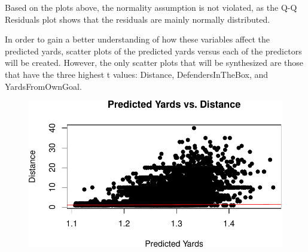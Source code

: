 \documentclass[
  super,
  preprint,
  3p]{elsarticle}
\newenvironment{Shaded}{\begin{snugshade}}{\end{snugshade}}
\newcommand{\AttributeTok}[1]{\textcolor[rgb]{0.40,0.45,0.13}{#1}}
\newcommand{\CommentTok}[1]{\textcolor[rgb]{0.37,0.37,0.37}{#1}}
\newcommand{\DecValTok}[1]{\textcolor[rgb]{0.68,0.00,0.00}{#1}}
\newcommand{\FunctionTok}[1]{\textcolor[rgb]{0.28,0.35,0.67}{#1}}
\newcommand{\NormalTok}[1]{\textcolor[rgb]{0.00,0.23,0.31}{#1}}
\newcommand{\OtherTok}[1]{\textcolor[rgb]{0.00,0.23,0.31}{#1}}
\newcommand{\SpecialCharTok}[1]{\textcolor[rgb]{0.37,0.37,0.37}{#1}}
\newcommand{\StringTok}[1]{\textcolor[rgb]{0.13,0.47,0.30}{#1}}
\begin{document}
Based on the plots above, the normality assumption is not violated, as
the Q-Q Residuals plot shows that the residuals are mainly normally
distributed.

In order to gain a better understanding of how these variables affect
the predicted yards, scatter plots of the predicted yards versus each of
the predictors will be created. However, the only scatter plots that
will be synthesized are those that have the three highest t values:
Distance, DefendersInTheBox, and YardsFromOwnGoal.

\begin{Shaded}
\end{Shaded}

\begin{Shaded}
\end{Shaded}

\begin{figure}[H]

{\centering \includegraphics{project_report_files/figure-pdf/unnamed-chunk-40-1.pdf}

}

\end{figure}
\end{document}
